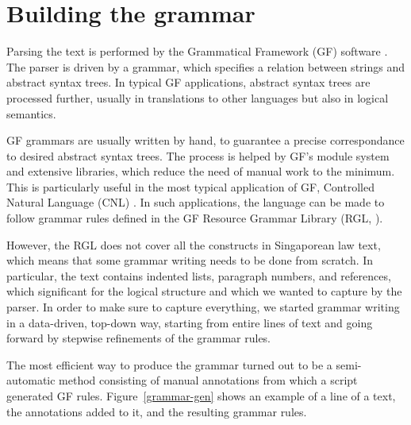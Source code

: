 \documentclass{IOS-Book-Article}
\begin{document}
\section{Building the grammar}

Parsing the text is performed by the Grammatical Framework (GF) software \cite{ranta-2011}.
The parser is driven by a grammar, which specifies a relation between strings and abstract syntax trees.
In typical GF applications, abstract syntax trees are processed further, usually in translations to other languages but also in logical semantics. 

GF grammars are usually written by hand, to guarantee a precise correspondance to desired abstract syntax trees.
The process is helped by GF's module system and extensive libraries, which reduce the need of manual work to the minimum.
This is particularly useful in the most typical application of GF, Controlled Natural Language (CNL) \cite{fuchs-al-2008,angelov-ranta-2009}.
In such applications, the language can be made to follow grammar rules defined in the GF Resource Grammar Library (RGL, \cite{ranta-2009}).

However, the RGL does not cover all the constructs in Singaporean law text, which means that some grammar writing needs to be done from scratch.
In particular, the text contains indented lists, paragraph numbers, and references, which significant for the logical structure and which we wanted to capture by the parser.
In order to make sure to capture everything, we started grammar writing in a data-driven, top-down way, starting from entire lines of text and going forward by stepwise refinements of the grammar rules.

The most efficient way to produce the grammar turned out to be a semi-automatic method consisting of manual annotations from which a script generated GF rules.
Figure~\ref{grammar-gen} shows an example of a line of a text, the annotations added to it, and the resulting grammar rules.
\end{document}
